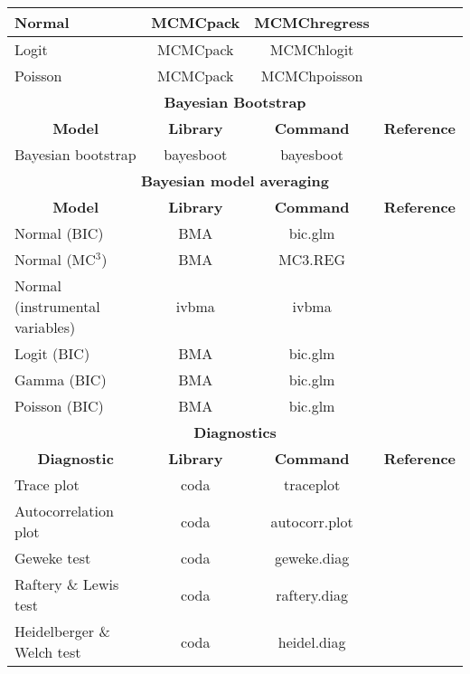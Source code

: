 \begin{table}[!ht]
\begin{center}
{{\begin{tabular}{|l|c|c|c|}
	Normal & MCMCpack & MCMChregress & \cite{Martin2018} \\
	\hline
	Logit & MCMCpack & MCMChlogit & \cite{Martin2018} \\
	\hline
	Poisson & MCMCpack & MCMChpoisson & \cite{Martin2018} \\
	\hline
	\multicolumn{4}{|c|}{\textbf{Bayesian Bootstrap}} \\
	\hline  
	\multicolumn{1}{|c|}{\textbf{Model}} & \multicolumn{1}{c}{\textbf{Library}} & \multicolumn{1}{|c|}{\textbf{Command}} &
	\multicolumn{1}{|c|}{\textbf{Reference}} \\ 
	\hline
	Bayesian bootstrap & bayesboot & bayesboot & \cite{Baath2018} \\
	\hline
	\multicolumn{4}{|c|}{\textbf{Bayesian model averaging}} \\
	\hline  
	\multicolumn{1}{|c|}{\textbf{Model}} & \multicolumn{1}{c}{\textbf{Library}} & \multicolumn{1}{|c|}{\textbf{Command}} &
	\multicolumn{1}{|c|}{\textbf{Reference}} \\ 
	\hline
	Normal (BIC) & BMA & bic.glm & \cite{Raftery2012} \\
	Normal (MC$^3$) & BMA & MC3.REG & \cite{Raftery2012} \\
	Normal (instrumental variables) & ivbma & ivbma & \cite{Lenkoski2013} \\
	Logit (BIC) & BMA & bic.glm & \cite{Raftery2012} \\
	Gamma (BIC) & BMA & bic.glm & \cite{Raftery2012} \\
	Poisson (BIC) & BMA & bic.glm & \cite{Raftery2012} \\
	\hline
	\multicolumn{4}{|c|}{\textbf{Diagnostics}} \\
	\hline  
	\multicolumn{1}{|c|}{\textbf{Diagnostic}} & \multicolumn{1}{c}{\textbf{Library}} & \multicolumn{1}{|c|}{\textbf{Command}} &
	\multicolumn{1}{|c|}{\textbf{Reference}} \\ 
	\hline
	Trace plot & coda & traceplot & \cite{Plummer2016} \\
	Autocorrelation plot & coda & autocorr.plot & \cite{Plummer2016} \\
	Geweke test & coda & geweke.diag & \cite{Plummer2016} \\
	Raftery \& Lewis test & coda & raftery.diag & \cite{Plummer2016} \\
	Heidelberger \& Welch test & coda & heidel.diag & \cite{Plummer2016} \\
	\hline
	\end{tabular}
}}
\end{center}
\end{table}